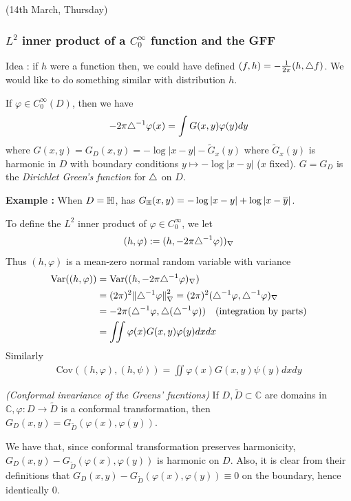 \documentclass[12pt,a4paper]{article}
\newenvironment{proof}
{\begin{changemargin}{0.5cm}{0.5cm} 
	}%
	{\end{changemargin}
}
\newenvironment{p}
{\begin{proof} 
	}%
	{\end{proof}
}
\begin{document}
\newday

(14th March, Thursday)

\subsubsection*{$L^2$ inner product of a $C_0^{\infty}$ function and the GFF}

Idea : if $h$ were a function then, we could have defined $(f,h) = -\frac{1}{2\pi} (h, \triangle f)$. We would like to do something similar with distribution $h$.
\s

If $\varphi \in C_0^{\infty}(D)$, then we have 
\begin{align*}
-2\pi \triangle^{-1} \varphi(x) = \int G(x,y) \varphi(y) dy
\end{align*}
where $G(x,y) = G_D(x,y) = -\log |x-y| -\tilde{G}_x(y)$ where $\tilde{G}_x(y)$ is harmonic in $D$ with boundary conditions $y\mapsto -\log |x-y|$ ($x$ fixed). $G= G_D$ is the \emph{Dirichlet Green's function} for $\triangle$ on $D$.
\s

\textbf{Example :} When $D= \mathbb{H}$, has $G_{\mathbb{H}}(x,y) =-\log |x-y| + \log |x-\overline{y}|$.
\s

To define the $L^2$ inner product of $\varphi \in C_0^{\infty}$, we let
\begin{align*}
(h, \varphi) := (h, -2\pi \triangle^{-1} \varphi) )_{\nabla}
\end{align*}
Thus $(h, \varphi)$ is a mean-zero normal random variable with variance
\begin{align*}
\text{Var}((h, \varphi)) &= \text{Var}((h, -2\pi \lap^{-1}\varphi)_{\nabla}) \\
&=(2\pi)^2 \snorms{\lap^{-1}\varphi}{\nabla}^2 = (2\pi)^2 (\lap^{-1}\varphi, \lap^{-1}\varphi)_{\nabla} \\
&= -2\pi (\lap^{-1}\varphi, \lap ( \lap^{-1} \varphi)) \quad \text{(integration by parts)} \\
&=\iint \varphi(x) G(x,y) \varphi(y)dxdx 
\end{align*}
Similarly
\begin{align*}
\text{Cov}((h, \varphi), (h, \psi)) = \iint \varphi(x) G(x,y) \psi(y) dxdy
\end{align*}
\s

\prop \emph{(Conformal invariance of the Greens' fucntions)} If $D, \tilde{D} \subset \mathbb{C}$ are domains in $\mathbb{C}, \varphi : D \rightarrow \tilde{D}$ is a conformal transformation, then $G_D(x,y) = G_{\tilde{D}}(\varphi(x),\varphi(y))$. 
\begin{p}
\pf We have that, since conformal transformation preserves harmonicity, $G_D(x,y) - G_{\tilde{D}}(\varphi(x), \varphi(y))$ is harmonic on $D$. Also, it is clear from their definitions that $G_D(x,y) - G_{\tilde{D}}(\varphi(x), \varphi(y)) \equiv 0$ on the boundary, hence identically 0.

\eop 
\end{p}
\s
\end{document}

